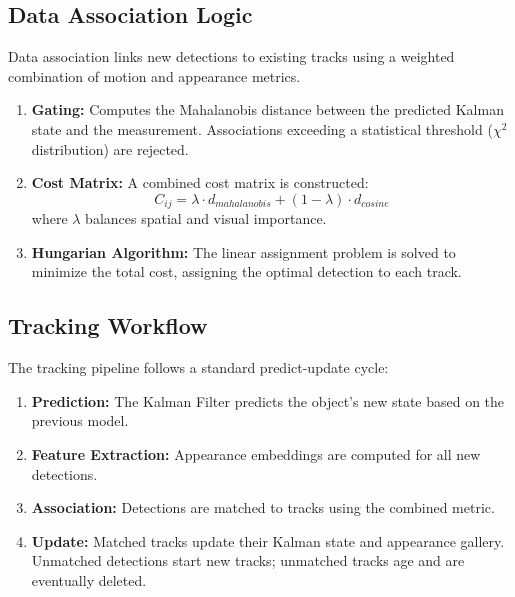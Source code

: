 \documentclass[12pt,a4paper]{report}
\begin{document}
{\subsection{Data Association Logic}
Data association links new detections to existing tracks using a weighted combination of motion and appearance metrics.
\begin{enumerate}
    \item \textbf{Gating:} Computes the Mahalanobis distance between the predicted Kalman state and the measurement. Associations exceeding a statistical threshold ($\chi^2$ distribution) are rejected.
    \item \textbf{Cost Matrix:} A combined cost matrix is constructed:
    \begin{equation}
    C_{ij} = \lambda \cdot d_{mahalanobis} + (1 - \lambda) \cdot d_{cosine}
    \end{equation}
    where $\lambda$ balances spatial and visual importance.
    \item \textbf{Hungarian Algorithm:} The linear assignment problem is solved to minimize the total cost, assigning the optimal detection to each track.
\end{enumerate}

\subsection{Tracking Workflow}
The tracking pipeline follows a standard predict-update cycle:
\begin{enumerate}
    \item \textbf{Prediction:} The Kalman Filter predicts the object's new state based on the previous model.
    \item \textbf{Feature Extraction:} Appearance embeddings are computed for all new detections.
    \item \textbf{Association:} Detections are matched to tracks using the combined metric.
    \item \textbf{Update:} Matched tracks update their Kalman state and appearance gallery. Unmatched detections start new tracks; unmatched tracks age and are eventually deleted.
\end{enumerate}

}
\end{document}
